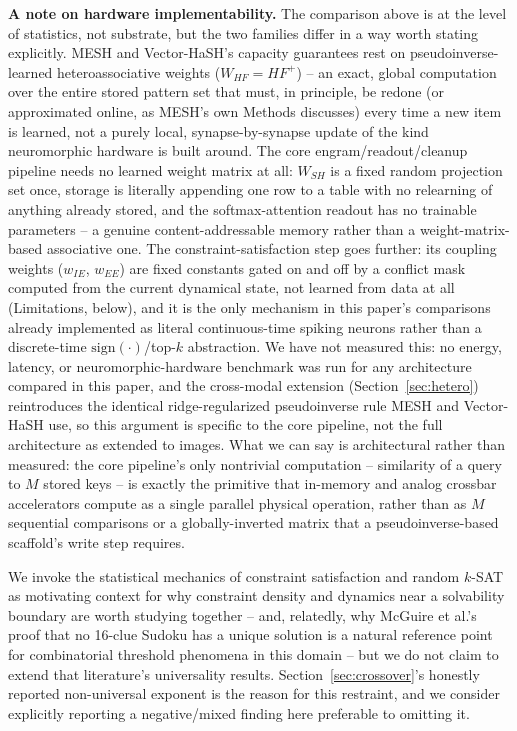 \documentclass[11pt]{article}
\begin{document}
\textbf{A note on hardware implementability.} The comparison above is at the level of
statistics, not substrate, but the two families differ in a way worth stating explicitly. MESH
and Vector-HaSH's capacity guarantees rest on pseudoinverse-learned heteroassociative weights
($W_{HF}=HF^+$) -- an exact, global computation over the entire stored pattern set that must, in
principle, be redone (or approximated online, as MESH's own Methods discusses) every time a new
item is learned, not a purely local, synapse-by-synapse update of the kind neuromorphic hardware
is built around. The core engram/readout/cleanup pipeline needs no learned weight matrix at all:
$W_{SH}$ is a fixed random projection set once, storage is literally appending one row to a
table with no relearning of anything already stored, and the softmax-attention readout has no
trainable parameters -- a genuine content-addressable memory rather than a weight-matrix-based
associative one. The constraint-satisfaction step goes further: its coupling weights ($w_{IE}$,
$w_{EE}$) are fixed constants gated on and off by a conflict mask computed from the current
dynamical state, not learned from data at all (Limitations, below), and it is the only mechanism
in this paper's comparisons already implemented as literal continuous-time spiking neurons
rather than a discrete-time $\mathrm{sign}(\cdot)$/top-$k$ abstraction. We have not measured
this: no energy, latency, or neuromorphic-hardware benchmark was run for any architecture
compared in this paper, and the cross-modal extension (Section~\ref{sec:hetero}) reintroduces
the identical ridge-regularized pseudoinverse rule MESH and Vector-HaSH use, so this argument is
specific to the core pipeline, not the full architecture as extended to images. What we can say
is architectural rather than measured: the core pipeline's only nontrivial computation --
similarity of a query to $M$ stored keys -- is exactly the primitive that in-memory and analog
crossbar accelerators compute as a single parallel physical operation, rather than as $M$
sequential comparisons or a globally-inverted matrix that a pseudoinverse-based scaffold's write
step requires.

We invoke the statistical mechanics of constraint satisfaction and random $k$-SAT
\cite{mezard2002,mezard2009} as motivating context for why constraint density and dynamics
near a solvability boundary are worth studying together -- and, relatedly, why McGuire et
al.'s proof that no 16-clue Sudoku has a unique solution \cite{mcguire2012} is a natural
reference point for combinatorial threshold phenomena in this domain -- but we do not claim
to extend that literature's universality results. Section~\ref{sec:crossover}'s honestly
reported non-universal exponent is the reason for this restraint, and we consider explicitly
reporting a negative/mixed finding here preferable to omitting it.
\end{document}
